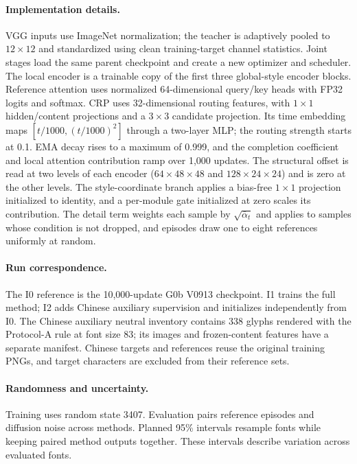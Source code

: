 \documentclass{article}
\begin{document}
\paragraph{Implementation details.}
VGG inputs use ImageNet normalization; the teacher is adaptively pooled to $12\times12$ and standardized using clean training-target channel statistics.
Joint stages load the same parent checkpoint and create a new optimizer and scheduler.
The local encoder is a trainable copy of the first three global-style encoder blocks.
Reference attention uses normalized 64-dimensional query/key heads with FP32 logits and softmax.
CRP uses 32-dimensional routing features, with $1\times1$ hidden/content projections and a $3\times3$ candidate projection.
Its time embedding maps $[t/1000,(t/1000)^2]$ through a two-layer MLP; the routing strength starts at 0.1.
EMA decay rises to a maximum of 0.999, and the completion coefficient and local attention contribution ramp over 1,000 updates.
The structural offset is read at two levels of each encoder ($64\times48\times48$ and $128\times24\times24$) and is zero at the other levels.
The style-coordinate branch applies a bias-free $1\times1$ projection initialized to identity, and a per-module gate initialized at zero scales its contribution.
The detail term weights each sample by $\sqrt{\bar\alpha_t}$ and applies to samples whose condition is not dropped, and episodes draw one to eight references uniformly at random.

\paragraph{Run correspondence.}
The I0 reference is the 10,000-update G0b V0913 checkpoint.
I1 trains the full method; I2 adds Chinese auxiliary supervision and initializes independently from I0.
The Chinese auxiliary neutral inventory contains 338 glyphs rendered with the Protocol-A rule at font size 83; its images and frozen-content features have a separate manifest.
Chinese targets and references reuse the original training PNGs, and target characters are excluded from their reference sets.

\paragraph{Randomness and uncertainty.}
Training uses random state 3407.
Evaluation pairs reference episodes and diffusion noise across methods.
Planned 95\% intervals resample fonts while keeping paired method outputs together.
These intervals describe variation across evaluated fonts.
\end{document}
